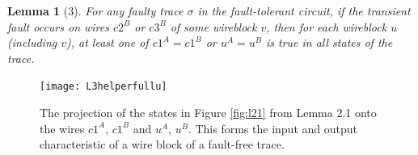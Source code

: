 \documentclass[12pt]{report}
\newtheorem*{lemma}{Lemma}
\begin{document}

\begin{lemma}[3]
For any faulty trace $\sigma$ in the fault-tolerant circuit, if the transient fault occurs on wires $c2^B$ or $c3^B$ of some wireblock $v$, then for each wireblock $u$ (including $v$), at least one of $c1^A=c1^B$ or $u^A=u^B$ is true in all states of the trace.


\end{lemma}
\begin{figure}
\centering
\texttt{[image: L3helperfullu]}
\caption[Fault-free transitions of $c1$ and $u$ wires]{The projection of the states in Figure \ref{fig:l21} from Lemma 2.1 onto the wires $c1^A$, $c1^B$ and $u^A$, $u^B$. This forms the input and output characteristic of a wire block of a fault-free trace.}
\label{fig:l3helper}
\end{figure}
\end{document}
